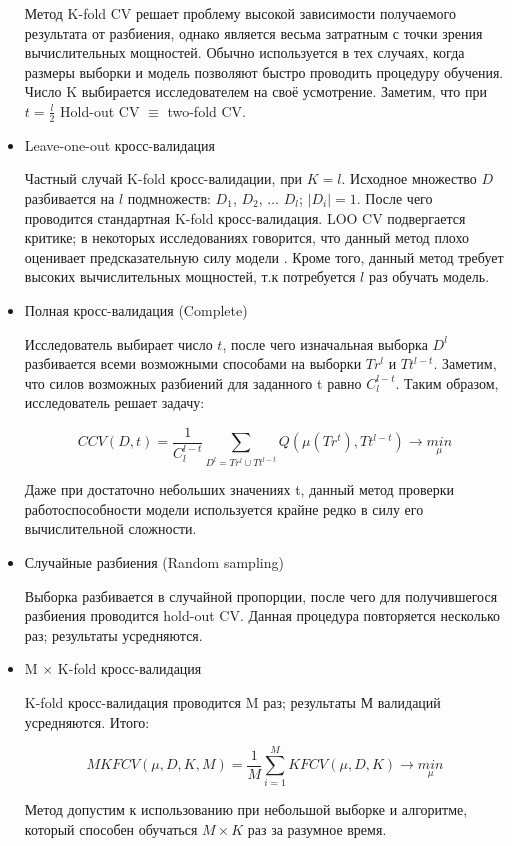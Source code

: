 \documentclass[a4paper, 14pt]{article}
\begin{document}
\begin{itemize}
	Метод K-fold CV решает проблему высокой зависимости получаемого результата от разбиения, однако является весьма затратным с точки зрения вычислительных мощностей. Обычно используется в тех случаях, когда размеры выборки и модель позволяют быстро проводить процедуру обучения. Число K выбирается исследователем на своё усмотрение. Заметим, что при $t = \frac{l}{2}$ Hold-out CV $ \equiv $ two-fold CV.
	
	\item Leave-one-out кросс-валидация
	
	Частный случай K-fold кросс-валидации, при $K=l$. Исходное множество $D$ разбивается на $l$ подмножеств: $D_1$, $D_2$, $\dots$ $D_l$; $\left|D_i\right| = 1$. После чего проводится стандартная K-fold кросс-валидация. LOO CV подвергается критике; в некоторых исследованиях говорится, что данный метод плохо оценивает предсказательную силу модели \cite{efron1986biased}. Кроме того, данный метод требует высоких вычислительных мощностей, т.к потребуется $l$ раз обучать модель.
	
	\item Полная кросс-валидация (Complete)
	
	Исследователь выбирает число $t$, после чего изначальная выборка $D^l$ разбивается всеми возможными способами на выборки $Tr^l$ и $Tt^{l-t}$. Заметим, что силов возможных разбиений для заданного t равно $C_l^{l-t}$. Таким образом, исследователь решает задачу:
	
	\[CCV(D, t) = \frac{1}{C_l^{l-t}} \sum_{D^l = Tr^l \cup Tt^{l-t}} Q(\mu (Tr^t), Tt^{l-t}) \rightarrow \underset{\mu}{min} \]
	
	Даже при достаточно небольших значениях t, данный метод проверки работоспособности модели используется крайне редко в силу его вычислительной сложности.
	
	\item Случайные разбиения (Random sampling)
	
	Выборка разбивается в случайной пропорции, после чего для получившегося разбиения проводится hold-out CV. Данная процедура повторяется несколько раз; результаты усредняются. 
	
	
	\item M $\times$ K-fold кросс-валидация
	
	K-fold кросс-валидация проводится M раз; результаты М валидаций усредняются. Итого: 
	
	\[MKFCV(\mu, D, K, M) = \frac{1}{M} \sum_{i=1}^{M} KFCV(\mu, D, K) \rightarrow \underset{\mu}{min}  \]
	
	Метод допустим к использованию при небольшой выборке и алгоритме, который способен обучаться $M \times K$ раз за разумное время.
\end{itemize}
\label{fkdsfsdfdsa}
\end{document}
